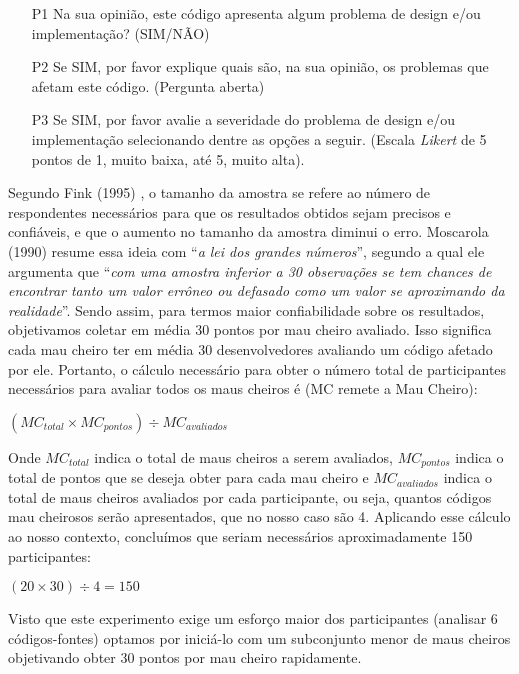 \noindent 
\begin{itemize}
  \item[P1] Na sua opinião, este código apresenta algum problema de design e/ou implementação? (SIM/NÃO)
  \item[P2] Se SIM, por favor explique quais são, na sua opinião, os problemas que afetam este código. (Pergunta aberta)
  \item[P3] Se SIM, por favor avalie a severidade do problema de design e/ou implementação selecionando dentre as opções a seguir. (Escala \textit{Likert} de 5 pontos de 1, muito baixa, até 5, muito alta).
\end{itemize}

Segundo Fink (1995) \cite{Fink:95}, o tamanho da amostra se refere ao número de respondentes necessários para que os resultados obtidos sejam precisos e confiáveis, e que o aumento no tamanho da amostra diminui o erro. Moscarola (1990) \cite{Moscarola:90} resume essa ideia com ``\textit{a lei dos grandes números}'', segundo a qual ele argumenta que ``\textit{com uma amostra inferior a 30 observações se tem chances de encontrar tanto um valor errôneo ou defasado como um valor se aproximando da realidade}''. Sendo assim, para termos maior confiabilidade sobre os resultados, objetivamos coletar em média 30 pontos por mau cheiro avaliado. Isso significa cada mau cheiro ter em média 30 desenvolvedores avaliando um código afetado por ele. Portanto, o cálculo necessário para obter o número total de participantes necessários para avaliar todos os maus cheiros é (MC remete a Mau Cheiro): 

\begin{center}
  $(MC_{total} \times MC_{pontos}) \div MC_{avaliados}$
\end{center}

Onde $MC_{total}$ indica o total de maus cheiros a serem avaliados, $MC_{pontos}$ indica o total de pontos que se deseja obter para cada mau cheiro e $MC_{avaliados}$ indica o total de maus cheiros avaliados por cada participante, ou seja, quantos códigos mau cheirosos serão apresentados, que no nosso caso são 4. Aplicando esse cálculo ao nosso contexto, concluímos que seriam necessários aproximadamente 150 participantes:

\begin{center}
  $(20 \times 30) \div 4 = 150$
\end{center}
 
Visto que este experimento exige um esforço maior dos participantes (analisar 6 códigos-fontes) optamos por iniciá-lo com um subconjunto menor de maus cheiros objetivando obter 30 pontos por mau cheiro rapidamente. 

